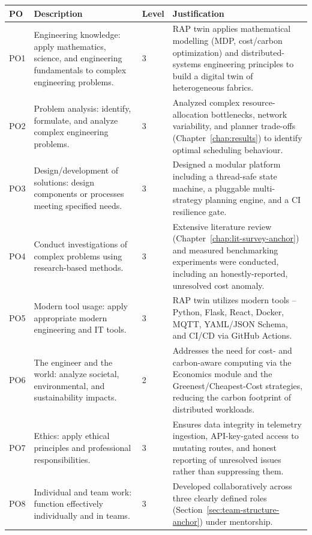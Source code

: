 \documentclass[12pt,a4]{report}
\begin{document}
\begin{appendices}
\begin{longtable}{|p{0.6cm}|p{6.3cm}|p{1cm}|p{6.5cm}|}
\hline
\textbf{PO} & \textbf{Description} & \textbf{Level} & \textbf{Justification} \\
\hline
\endhead
PO1 & Engineering knowledge: apply mathematics, science, and engineering fundamentals to complex engineering problems. & 3 & RAP twin applies mathematical modelling (MDP, cost/carbon optimization) and distributed-systems engineering principles to build a digital twin of heterogeneous fabrics. \\
\hline
PO2 & Problem analysis: identify, formulate, and analyze complex engineering problems. & 3 & Analyzed complex resource-allocation bottlenecks, network variability, and planner trade-offs (Chapter~\ref{chap:results}) to identify optimal scheduling behaviour. \\
\hline
PO3 & Design/development of solutions: design components or processes meeting specified needs. & 3 & Designed a modular platform including a thread-safe state machine, a pluggable multi-strategy planning engine, and a CI resilience gate. \\
\hline
PO4 & Conduct investigations of complex problems using research-based methods. & 3 & Extensive literature review (Chapter~\ref{chap:lit-survey-anchor}) and measured benchmarking experiments were conducted, including an honestly-reported, unresolved cost anomaly. \\
\hline
PO5 & Modern tool usage: apply appropriate modern engineering and IT tools. & 3 & RAP twin utilizes modern tools -- Python, Flask, React, Docker, MQTT, YAML/JSON Schema, and CI/CD via GitHub Actions. \\
\hline
PO6 & The engineer and the world: analyze societal, environmental, and sustainability impacts. & 2 & Addresses the need for cost- and carbon-aware computing via the Economics module and the Greenest/Cheapest-Cost strategies, reducing the carbon footprint of distributed workloads. \\
\hline
PO7 & Ethics: apply ethical principles and professional responsibilities. & 3 & Ensures data integrity in telemetry ingestion, API-key-gated access to mutating routes, and honest reporting of unresolved issues rather than suppressing them. \\
\hline
PO8 & Individual and team work: function effectively individually and in teams. & 3 & Developed collaboratively across three clearly defined roles (Section~\ref{sec:team-structure-anchor}) under mentorship. \\

\end{longtable}
\end{appendices}
\end{document}
